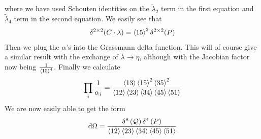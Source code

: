 \documentclass[letter,11pt]{article}
\begin{document}
where we have used Schouten identities on the $\tilde\lambda_2$ term in the first equation and $\tilde \lambda_4$ term in the second equation. We easily see that
\begin{equation}
	\begin{aligned}
		\delta^{2\times 2}(C\cdot\lambda)=\expval{15}^2\delta^{2\times 2}(P)
	\end{aligned}
\end{equation}
Then we plug the $\alpha$'s into the Grassmann delta function. This will of course give a similar result with the exchange of $\tilde\lambda\to \tilde\eta$, although with the Jacobian factor now being $\frac{1}{\expval{15}^4}$. Finally we calculate
\begin{equation}
	\begin{aligned}
		\prod_i\frac{1}{\alpha_i}=\frac{\expval{13} \expval{15}^2 \expval{35}^2}{\expval{12}\expval{23}\expval{34}\expval{45}\expval{51}}
	\end{aligned}
\end{equation}
We are now easily able to get the form
\begin{equation}
	\begin{aligned}
		\dd \Omega =
		\frac{\delta^{8}\left(\mathcal{Q}\right)\delta^{4}\left(P\right)}{\expval{12}\expval{23}\expval{34}\expval{45}\expval{51}}
	\end{aligned}
\end{equation}
\end{document}
